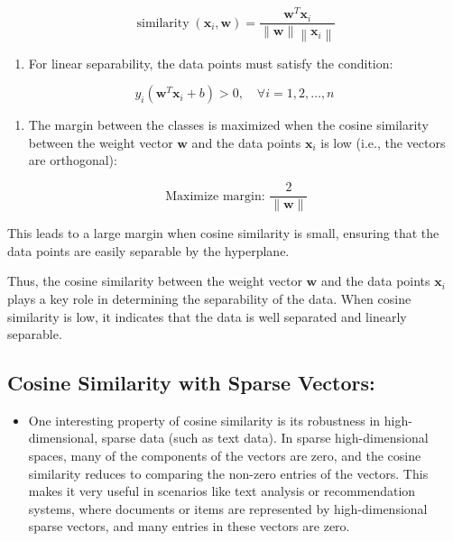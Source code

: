 \documentclass[
  12 pt,
  a4paper,
]{book}
\providecommand{\tightlist}{%
  \setlength{\itemsep}{0pt}\setlength{\parskip}{0pt}}
\numberwithin{equation}{section}
\theoremstyle{plain}      %
\theoremstyle{definition} %
\theoremstyle{remark}     %
\theoremstyle{note}         %
\begin{document}
\[
\operatorname{similarity}\left(\mathbf{x}_i, \mathbf{w}\right)=\frac{\mathbf{w}^T \mathbf{x}_i}{\|\mathbf{w}\|\left\|\mathbf{x}_i\right\|}
\]

\begin{enumerate}
\def\labelenumi{\arabic{enumi}.}
\setcounter{enumi}{1}
\tightlist
\item
  For linear separability, the data points must satisfy the condition:
\end{enumerate}

\[
y_i\left(\mathbf{w}^T \mathbf{x}_i+b\right)>0, \quad \forall i=1,2, \ldots, n
\]

\begin{enumerate}
\def\labelenumi{\arabic{enumi}.}
\setcounter{enumi}{2}
\tightlist
\item
  The margin between the classes is maximized when the cosine similarity
  between the weight vector \(\mathbf{w}\) and the data points
  \(\mathbf{x}_i\) is low (i.e., the vectors are orthogonal):
\end{enumerate}

\[
\text { Maximize margin: } \frac{2}{\|\mathbf{w}\|}
\]

This leads to a large margin when cosine similarity is small, ensuring
that the data points are easily separable by the hyperplane.

Thus, the cosine similarity between the weight vector \(\mathbf{w}\) and
the data points \(\mathbf{x}_i\) plays a key role in determining the
separability of the data. When cosine similarity is low, it indicates
that the data is well separated and linearly separable.

\newpage

\hypertarget{cosine-similarity-with-sparse-vectors}{%
\subsection{Cosine Similarity with Sparse
Vectors:}\label{cosine-similarity-with-sparse-vectors}}

\begin{itemize}
\tightlist
\item
  One interesting property of cosine similarity is its robustness in
  high-dimensional, sparse data (such as text data). In sparse
  high-dimensional spaces, many of the components of the vectors are
  zero, and the cosine similarity reduces to comparing the non-zero
  entries of the vectors. This makes it very useful in scenarios like
  text analysis or recommendation systems, where documents or items are
  represented by high-dimensional sparse vectors, and many entries in
  these vectors are zero.
\end{itemize}
\end{document}
